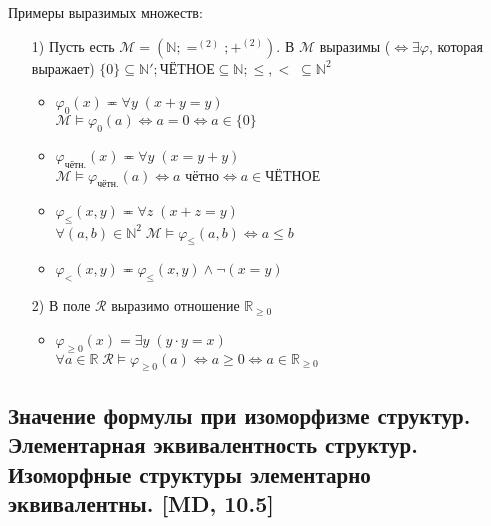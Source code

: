 \documentclass[a4paper, fleqn]{article}
\begin{document}
    Примеры выразимых множеств: \\
    \begin{enumerate}
        \item[1)] Пусть есть $\mathcal{M} = (\mathbb{N}; =^{(2)}; +^{(2)})$. В $\mathcal{M}$ выразимы ($\Leftrightarrow \exists \varphi$, которая выражает) $\{0\} \subseteq \mathbb{N}'; \text{ЧЁТНОЕ} \subseteq \mathbb{N}; \leq, < \; \subseteq \mathbb{N}^2$ \\
        \begin{itemize}
            \item $\varphi_0(x) \eqcirc \forall y \; (x + y = y)$ \\
            $\mathcal{M} \vDash \varphi_0(a) \Leftrightarrow a = 0 \Leftrightarrow a \in \{0\}$ \\
            \item $\varphi_{\text{чётн.}}(x) \eqcirc \forall y \; (x = y + y)$ \\
            $\mathcal{M} \vDash \varphi_{\text{чётн.}}(a) \Leftrightarrow a\text{ чётно} \Leftrightarrow a \in \text{ЧЁТНОЕ}$ \\
            \item $\varphi_{\leq}(x, y) \eqcirc \forall z \; (x + z = y)$ \\
            $\forall (a, b) \in \mathbb{N}^2 \; \mathcal{M} \vDash \varphi_{\leq}(a, b) \Leftrightarrow a \leq b$ \\
            \item $\varphi_{<}(x, y) \eqcirc \varphi_{\leq}(x, y) \wedge \neg (x = y)$
        \end{itemize}
        \item[2)] В поле $\mathcal{R}$ выразимо отношение $\mathbb{R}_{\geq 0}$ \\
        \begin{itemize}
            \item $\varphi_{\geq 0}(x) = \exists y \; (y \cdot y = x)$ \\
            $\forall a \in \mathbb{R} \; \mathcal{R} \vDash \varphi_{\geq 0}(a) \Leftrightarrow a \geq 0 \Leftrightarrow a \in \mathbb{R}_{\geq 0}$
        \end{itemize}
    \end{enumerate}
    \subsection{Значение формулы при изоморфизме структур. Элементарная эквивалентность структур. Изоморфные структуры элементарно эквивалентны. [MD, 10.5]}
\end{document}
